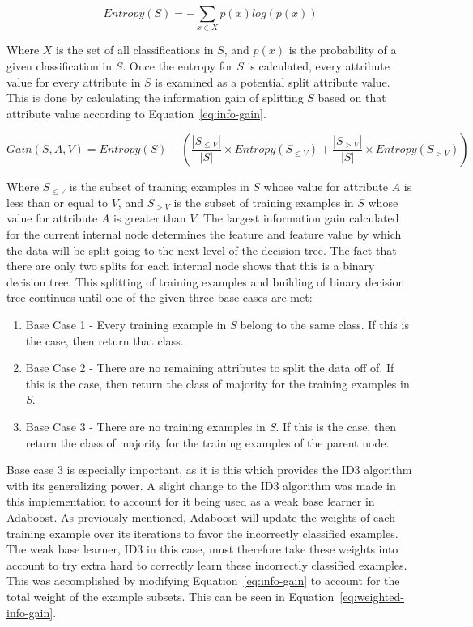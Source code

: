 \documentclass[a4paper]{article}
\begin{document}
\begin{equation}
    \label{eq:entropy}
    Entropy(S) = -\sum_{x \in X} p(x)log(p(x))
\end{equation}

Where $X$ is the set of all classifications in $S$, and $p(x)$ is the probability of a given classification in $S$. Once the entropy for $S$ is calculated, every attribute value for every attribute in $S$ is examined as a potential split attribute value. This is done by calculating the information gain of splitting $S$ based on that attribute value according to Equation~\ref{eq:info-gain}.

\begin{equation}
    \label{eq:info-gain}
    Gain(S, A, V) = Entropy(S) - \left(\frac{|S_{\le V}|}{|S|}\times Entropy(S_{\le V}) + \frac{|S_{> V}|}{|S|}\times Entropy(S_{> V}) \right)
\end{equation}

Where $S_{\le V}$ is the subset of training examples in $S$ whose value for attribute $A$ is less than or equal to $V$, and $S_{> V}$ is the subset of training examples in $S$ whose value for attribute $A$ is greater than $V$. The largest information gain calculated for the current internal node determines the feature and feature value by which the data will be split going to the next level of the decision tree. The fact that there are only two splits for each internal node shows that this is a binary decision tree. This splitting of training examples and building of binary decision tree continues until one of the given three base cases are met:
\begin{enumerate}
    \item Base Case 1 - Every training example in \textit{S} belong to the same class. If this is the case, then return that class.

    \item Base Case 2 - There are no remaining attributes to split the data off of. If this is the case, then return the class of majority for the training examples in \textit{S}.

    \item Base Case 3 - There are no training examples in \textit{S}. If this is the case, then return the class of majority for the training examples of the parent node.
\end{enumerate}
Base case 3 is especially important, as it is this which provides the ID3 algorithm with its generalizing power. A slight change to the ID3 algorithm was made in this implementation to account for it being used as a weak base learner in Adaboost. As previously mentioned, Adaboost will update the weights of each training example over its iterations to favor the incorrectly classified examples. The weak base learner, ID3 in this case, must therefore take these weights into account to try extra hard to correctly learn these incorrectly classified examples. This was accomplished by modifying Equation~\ref{eq:info-gain} to account for the total weight of the example subsets. This can be seen in Equation~\ref{eq:weighted-info-gain}.
\end{document}
